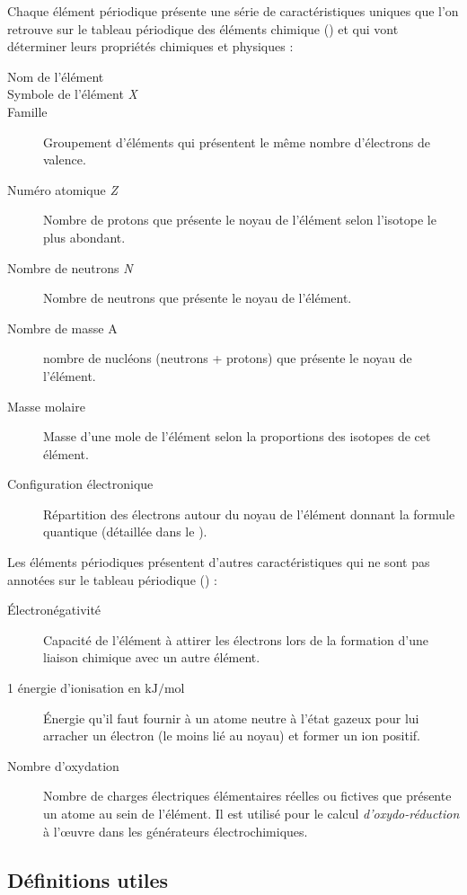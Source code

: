 Chaque élément périodique présente une série de caractéristiques uniques que l'on retrouve sur le tableau périodique des éléments chimique () et qui vont déterminer leurs propriétés chimiques et physiques :
\begin{description}
	\item[Nom de l'élément]
	\item[Symbole de l'élément \emph{X}]
	\item[Famille] Groupement d'éléments qui présentent le même nombre d'électrons de valence.
	\item[Numéro atomique \emph{Z}] Nombre de protons que présente le noyau de l'élément selon l'isotope le plus abondant.
	\item[Nombre de neutrons \emph{N}] Nombre de neutrons que présente le noyau de l'élément.
	\item[Nombre de masse A] nombre de nucléons (neutrons + protons) que présente le noyau de l'élément.
	\item[Masse molaire] Masse d'une mole de l'élément selon la proportions des isotopes de cet élément.
	\item[Configuration électronique] Répartition des électrons autour du noyau de l'élément donnant la formule quantique (détaillée dans le ).
\end{description}

\pagebreak

Les éléments périodiques présentent d'autres caractéristiques qui ne sont pas annotées sur le tableau périodique () :
\begin{description}
	\item[\'Electronégativité] Capacité de l'élément à attirer les électrons lors de la formation d'une liaison chimique avec un autre élément.
	\item[1\iere{} énergie d'ionisation en $\si{\kilo\joule\per\mol}$] \'Energie qu'il faut fournir à un atome neutre à l'état gazeux pour lui arracher un électron (le moins lié au noyau) et former un ion positif.
	\item[Nombre d'oxydation] Nombre de charges électriques élémentaires réelles ou fictives que présente un atome au sein de l'élément. Il est utilisé pour le calcul \emph{d'oxydo-réduction} à l'\oe{}uvre dans les générateurs électrochimiques.
\end{description}

\subsection{Définitions utiles}

